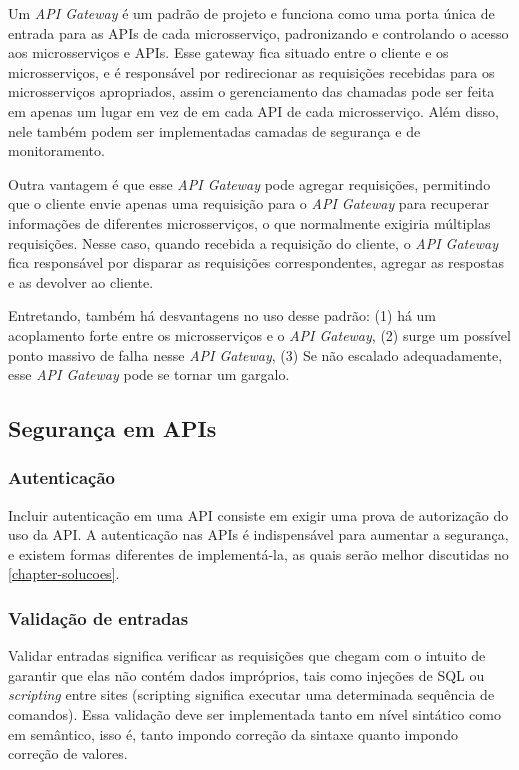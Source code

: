 Um \emph{API Gateway} é um padrão de projeto e funciona como uma porta única de entrada para as APIs de cada microsserviço, padronizando e controlando o acesso aos microsserviços e APIs. Esse gateway fica situado entre o cliente e os microsserviços, e é responsável por redirecionar as requisições recebidas para os microsserviços apropriados, assim o gerenciamento das chamadas pode ser feita em apenas um lugar em vez de em cada API de cada microsserviço. Além disso, nele também podem ser implementadas camadas de segurança e de monitoramento.

Outra vantagem é que esse \emph{API Gateway} pode agregar requisições, permitindo que o cliente envie apenas uma requisição para o \emph{API Gateway} para recuperar informações de diferentes microsserviços, o que normalmente exigiria múltiplas requisições. Nesse caso, quando recebida a requisição do cliente, o \emph{API Gateway} fica responsável por disparar as requisições correspondentes, agregar as respostas e as devolver ao cliente.

Entretando, também há desvantagens no uso desse padrão: (1) há um acoplamento forte entre os microsserviços e o \emph{API Gateway}, (2) surge um possível ponto massivo de falha nesse \emph{API Gateway}, (3) Se não escalado adequadamente, esse \emph{API Gateway} pode se tornar um gargalo. \cite{microsoft-api-gateway}

\subsection{Segurança em APIs}

\subsubsection*{Autenticação}

Incluir autenticação em uma API consiste em exigir uma prova de autorização do uso da API. A autenticação nas APIs é indispensável para aumentar a segurança, e existem formas diferentes de implementá-la, as quais serão melhor discutidas no \autoref{chapter-solucoes}.

\subsubsection*{Validação de entradas}

Validar entradas significa verificar as requisições que chegam com o intuito de garantir que elas não contém dados impróprios, tais como injeções de SQL ou \emph{scripting} entre sites (scripting significa executar uma determinada sequência de comandos). Essa validação deve ser implementada tanto em nível sintático como em semântico, isso é, tanto impondo correção da sintaxe quanto impondo correção de valores. \cite{rapidAPI-twitter}

